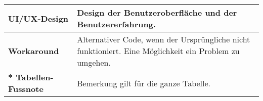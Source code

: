 \begin{table}[!ht]
\begin{adjustbox}{max width=\textwidth}
\begin{threeparttable}
\begin{tabular}{ p{\glossarywithTitle} | p{\glossarywith} }
                \hline
                \bf{UI/UX-Design} & Design der Benutzeroberfläche und der Benutzererfahrung. \\
                \hline
                \bf{Workaround} & 
                    Alternativer Code, wenn der Ursprüngliche nicht funktioniert. 
                    Eine Möglichkeit ein Problem zu umgehen. \\
                \hline
                \hline
                \bf{* Tabellen-Fussnote} & Bemerkung gilt für die ganze Tabelle. \\
                \hline
            \end{tabular}
        \end{threeparttable}
    \end{adjustbox}
\end{table}
